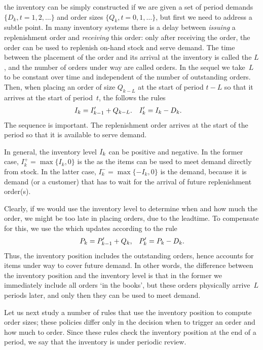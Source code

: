 \documentclass[stochastic-or.tex]{subfiles}
\begin{document}
 the inventory can be simply constructed if we are given a set of period demands $\{D_k, t=1, 2, \ldots\}$ and order sizes $\{Q_k, t=0, 1, \ldots\}$, but first we need to address a subtle point.
In many inventory systems there is a delay between \emph{issuing} a replenishment order and \emph{receiving} this order:  only after receiving the order, the order can be used to replenish on-hand stock and serve demand.  The time between the placement of the order and its arrival at the inventory is called the  $L$, and the number of orders under way are called  orders. In the sequel we take~$L$ to be constant over time and independent of the number of outstanding orders.
Then, when placing an order of size $Q_{k-L}$ at the start of period $t-L$ so that it arrives at the start of period~$t$,  the   follows  the rules
\begin{align}\label{eq:i5}
  I_k &= I_{k-1}'+Q_{k-L}. & I_k' &= I_{k} - D_k.
\end{align}
The sequence is important. The replenishment order arrives at the start of the period so that it is available to serve demand.

In general, the inventory level $I_k$ can be positive and negative.
In the former case, $I_k^{+} = \max\{I_k,0\}$ is the  as the items can be used to meet demand directly from stock.
In the latter case, $I^{-}_k = \max\{-I_k, 0\}$ is the  demand, because it is demand (or a customer) that has to wait for the arrival of future replenishment order(s).

Clearly, if we would use the inventory level to determine when and how much the order, we might be too late in placing orders, due to the leadtime. To compensate for this, we use the   which updates according to the rule
\begin{align}\label{eq:b9}
  P_k &= P_{k-1}' + Q_k, & P_k' = P_{k}- D_k.
\end{align}
Thus, the inventory position includes the outstanding orders, hence accounts for items under way to cover future demand.
In other words, the difference between the inventory position and the inventory level is that in the former we immediately include all orders `in the books', but these orders physically arrive~$L$ periods later, and only then they can be used to meet demand.


Let us next study a number of rules that use the inventory position to compute order sizes; these policies differ only in the decision when to trigger an order and how much to order. Since these rules check the inventory position at the end of a period, we say that the inventory is under periodic review.
\end{document}
